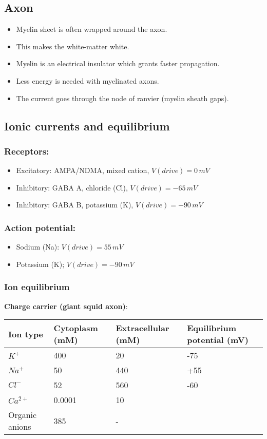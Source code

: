 \documentclass[main]{subfiles}
\begin{document}
\subsection{Axon}
\begin{itemize}[noitemsep,nolistsep]
	\item Myelin sheet is often wrapped around the axon.
	\item This makes the white-matter white.
	\item Myelin is an electrical insulator which grants faster propagation.
	\item Less energy is needed with myelinated axons.
	\item The current goes through the node of ranvier (myelin sheath gaps).
\end{itemize}

\subsection{Ionic currents and equilibrium}
\subsubsection{Receptors:}
\begin{itemize}[noitemsep,nolistsep]
	\item Excitatory: AMPA/NDMA, mixed cation, $V(drive) =0\,mV$
	\item Inhibitory: GABA A, chloride (Cl), $V(drive) =-65\,mV$
	\item Inhibitory: GABA B, potassium (K), $V(drive) =-90\,mV$
\end{itemize}
\subsubsection{Action potential:}
\begin{itemize}[noitemsep,nolistsep]
	\item Sodium (Na): $V(drive) = 55\,mV$
	\item Potassium (K); $V(drive) = -90\,mV$
\end{itemize}

\subsubsection{Ion equilibrium}
\textbf{Charge carrier (giant squid axon)}:\\
\begin{tabular}{|l|l|l|l|}
	\hline
	Ion type & Cytoplasm (mM) & Extracellular (mM) & Equilibrium potential (mV)\\\hline
	$K^+$ & 400 & 20 & -75 \\\hline
	$Na^+$ & 50 & 440 & +55\\\hline
	$Cl^-$ & 52 & 560 & -60\\\hline
	$Ca^{2+}$ & 0.0001 & 10 &\\\hline
	Organic anions & 385 & - &\\\hline
\end{tabular}
\begin{figure}[H]
	\centering
\end{figure}
\end{document}
